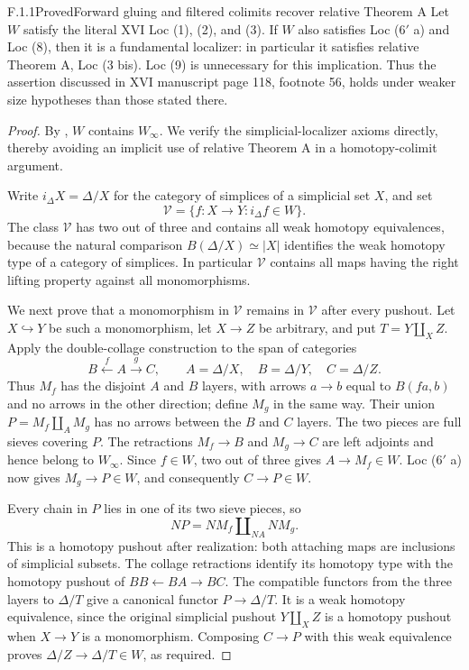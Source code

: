 \begin{claim}{F.1.1}{Proved}{Forward gluing and filtered colimits recover relative Theorem A}
Let $W$ satisfy the literal XVI Loc (1), (2), and (3). If $W$ also satisfies Loc ($6'$ a) and Loc (8), then it is a fundamental localizer: in particular it satisfies relative Theorem A, Loc (3 bis). Loc (9) is unnecessary for this implication. Thus the assertion discussed in XVI manuscript page 118, footnote 56, holds under weaker size hypotheses than those stated there.
\end{claim}
\begin{proof}
By \citet[Theorem 6.1.18]{FGHCisinski2006}, $W$ contains $W_\infty$. We verify the simplicial-localizer axioms directly, thereby avoiding an implicit use of relative Theorem A in a homotopy-colimit argument.

Write $i_\Delta X=\Delta/X$ for the category of simplices of a simplicial set $X$, and set
\[
 \mathcal V=\{f:X\longrightarrow Y:i_\Delta f\in W\}.
\]
The class $\mathcal V$ has two out of three and contains all weak homotopy equivalences, because the natural comparison $B(\Delta/X)\simeq |X|$ identifies the weak homotopy type of a category of simplices. In particular $\mathcal V$ contains all maps having the right lifting property against all monomorphisms.

We next prove that a monomorphism in $\mathcal V$ remains in $\mathcal V$ after every pushout. Let $X\hookrightarrow Y$ be such a monomorphism, let $X\to Z$ be arbitrary, and put $T=Y\amalg_X Z$. Apply the double-collage construction to the span of categories
\[
 B\xleftarrow{f}A\xrightarrow{g}C,
 \qquad A=\Delta/X,\quad B=\Delta/Y,\quad C=\Delta/Z.
\]
Thus $M_f$ has the disjoint $A$ and $B$ layers, with arrows $a\to b$ equal to $B(fa,b)$ and no arrows in the other direction; define $M_g$ in the same way. Their union $P=M_f\amalg_A M_g$ has no arrows between the $B$ and $C$ layers. The two pieces are full sieves covering $P$. The retractions $M_f\to B$ and $M_g\to C$ are left adjoints and hence belong to $W_\infty$. Since $f\in W$, two out of three gives $A\to M_f\in W$. Loc ($6'$ a) now gives $M_g\to P\in W$, and consequently $C\to P\in W$.

Every chain in $P$ lies in one of its two sieve pieces, so
\[
 NP=NM_f\amalg_{NA}NM_g.
\]
This is a homotopy pushout after realization: both attaching maps are inclusions of simplicial subsets. The collage retractions identify its homotopy type with the homotopy pushout of $BB\leftarrow BA\to BC$. The compatible functors from the three layers to $\Delta/T$ give a canonical functor $P\to\Delta/T$. It is a weak homotopy equivalence, since the original simplicial pushout $Y\amalg_X Z$ is a homotopy pushout when $X\to Y$ is a monomorphism. Composing $C\to P$ with this weak equivalence proves $\Delta/Z\to\Delta/T\in W$, as required.


\end{proof}
